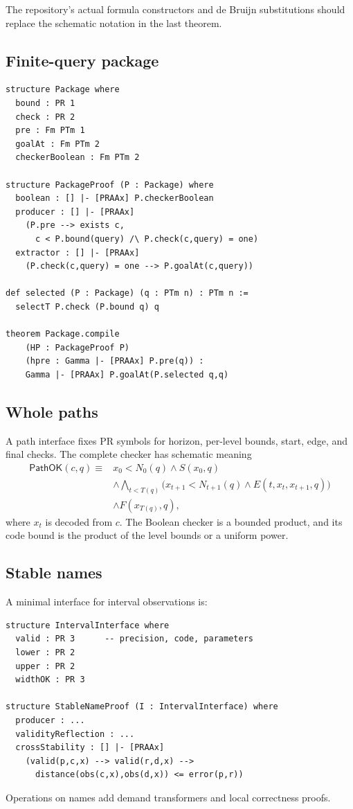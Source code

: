 The repository's actual formula constructors and de Bruijn substitutions should
replace the schematic notation in the last theorem.

\subsection{Finite-query package}

\begin{lstlisting}[language=Lean]
structure Package where
  bound : PR 1
  check : PR 2
  pre : Fm PTm 1
  goalAt : Fm PTm 2
  checkerBoolean : Fm PTm 2

structure PackageProof (P : Package) where
  boolean : [] |- [PRAAx] P.checkerBoolean
  producer : [] |- [PRAAx]
    (P.pre --> exists c,
      c < P.bound(query) /\ P.check(c,query) = one)
  extractor : [] |- [PRAAx]
    (P.check(c,query) = one --> P.goalAt(c,query))

def selected (P : Package) (q : PTm n) : PTm n :=
  selectT P.check (P.bound q) q

theorem Package.compile
    (HP : PackageProof P)
    (hpre : Gamma |- [PRAAx] P.pre(q)) :
    Gamma |- [PRAAx] P.goalAt(P.selected q,q)
\end{lstlisting}

\subsection{Whole paths}

A path interface fixes PR symbols for horizon, per-level bounds, start, edge,
and final checks.  The complete checker has schematic meaning
\[
 \begin{split}
 \mathsf{PathOK}(c,q)\equiv{}&
  x_0<N_0(q)\wedge S(x_0,q)\\
 &\wedge\bigwedge_{t<T(q)}
   \bigl(x_{t+1}<N_{t+1}(q)\wedge E(t,x_t,x_{t+1},q)\bigr)\\
 &\wedge F(x_{T(q)},q),
 \end{split}
\]
where \(x_t\) is decoded from \(c\).  The Boolean checker is a bounded product,
and its code bound is the product of the level bounds or a uniform power.

\subsection{Stable names}

A minimal interface for interval observations is:

\begin{lstlisting}[language=Lean]
structure IntervalInterface where
  valid : PR 3      -- precision, code, parameters
  lower : PR 2
  upper : PR 2
  widthOK : PR 3

structure StableNameProof (I : IntervalInterface) where
  producer : ...
  validityReflection : ...
  crossStability : [] |- [PRAAx]
    (valid(p,c,x) --> valid(r,d,x) -->
      distance(obs(c,x),obs(d,x)) <= error(p,r))
\end{lstlisting}

Operations on names add demand transformers and local correctness proofs.
